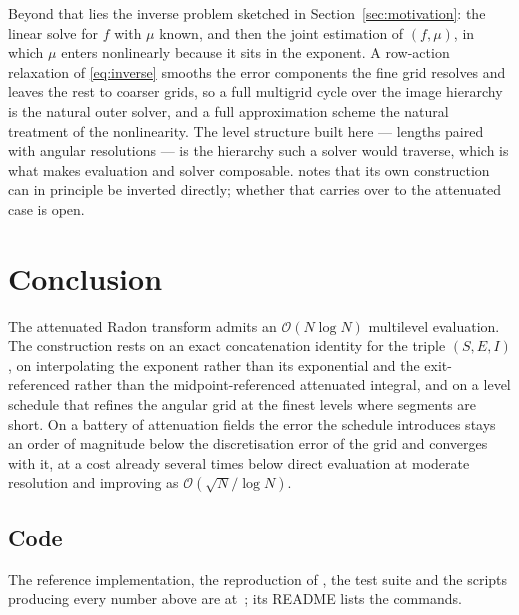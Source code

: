 \documentclass[11pt]{article}
\newcommand{\bigO}{\mathcal{O}}
\begin{document}
Beyond that lies the inverse problem sketched in
Section~\ref{sec:motivation}: the linear solve for $f$ with $\mu$ known, and
then the joint estimation of $(f,\mu)$, in which $\mu$ enters nonlinearly
because it sits in the exponent. A row-action relaxation of \eqref{eq:inverse}
smooths the error components the fine grid resolves and leaves the rest to
coarser grids, so a full multigrid cycle over the image hierarchy is the natural
outer solver, and a full approximation scheme \citep{brandt1977} the natural
treatment of the nonlinearity. The level structure built here --- lengths paired
with angular resolutions --- is the hierarchy such a solver would traverse,
which is what makes evaluation and solver composable. \citep{brandtdym1999}
notes that its own construction can in principle be inverted directly; whether
that carries over to the attenuated case is open.

\section{Conclusion}

The attenuated Radon transform admits an $\bigO(N\log N)$ multilevel
evaluation. The construction rests on an exact concatenation identity for the
triple $(S,E,I)$, on interpolating the exponent rather than its exponential and
the exit-referenced rather than the midpoint-referenced attenuated integral,
and on a level schedule that refines the angular grid at the finest levels
where segments are short. On a battery of attenuation fields the error the
schedule introduces stays an order of magnitude below the discretisation error
of the grid and converges with it, at a cost already several times below direct
evaluation at moderate resolution and improving as $\bigO(\sqrt{N}/\log N)$.

\subsection*{Code}

The reference implementation, the reproduction of \citep{brandtdym1999}, the
test suite and the scripts producing every number above are
at~\citep{tomogrid}; its README lists the commands.



\end{document}
